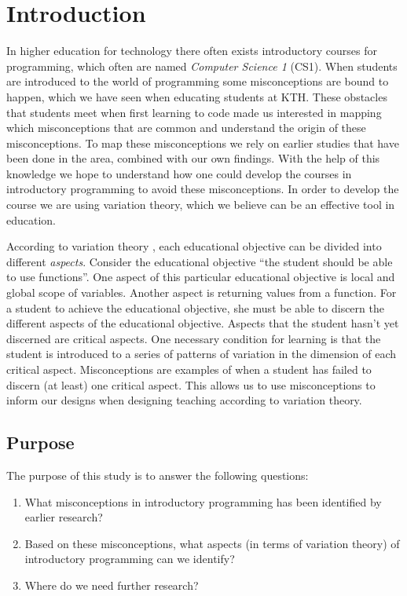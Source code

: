 \section{Introduction}


In higher education for technology there often exists introductory courses for programming, which often are named \emph{Computer Science 1} (CS1). When students are introduced to the world of programming some misconceptions are bound to happen, which we have seen when educating students at KTH. These obstacles that students meet when first learning to code made us interested in mapping which misconceptions that are common and understand the origin of these misconceptions. To map these misconceptions we rely on earlier studies that have been done in the area, combined with our own findings. With the help of this knowledge we hope to understand how one could develop the courses in introductory programming to avoid these misconceptions. In order to develop the course we are using variation theory, which we believe can be an effective tool in education. 


According to variation theory \parencite[Ch.~2]{NCOL}, each educational 
objective can be divided into different \emph{aspects}.
Consider the educational objective \enquote{the student should be able to use 
functions}.
One aspect of this particular educational objective is local and global scope 
of variables.
Another aspect is returning values from a function.
For a student to achieve the educational objective, she must be able to discern 
the different aspects of the educational objective.
Aspects that the student hasn't yet discerned are critical aspects.
One necessary condition for learning is that the student is introduced to a 
series of patterns of variation in the dimension of each critical aspect.
Misconceptions are examples of when a student has failed to discern (at least) 
one critical aspect.
This allows us to use misconceptions to inform our designs when designing 
teaching according to variation theory.

\subsection{Purpose}

The purpose of this study is to answer the following questions:
\begin{enumerate}
  \item What misconceptions in introductory programming has been identified by 
    earlier research?
  \item Based on these misconceptions, what aspects (in terms of variation 
    theory) of introductory programming can we identify?
  \item Where do we need further research?
\end{enumerate}